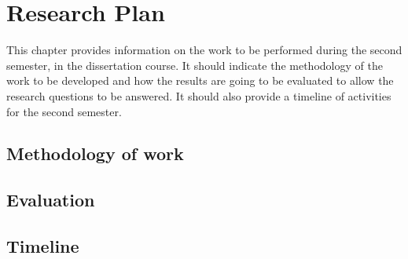 
\chapter{Research Plan} %
\label{chap:Chapter4} %


This chapter provides information on the work to be performed during the second semester, in the dissertation course. It should indicate the methodology of the work to be developed and how the results are going to be evaluated to allow the research questions to be answered. It should also provide a timeline of activities for the second semester. 

\section{Methodology of work}


\section{Evaluation}


\section{Timeline}

